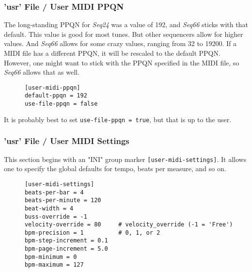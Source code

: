 \subsubsection{'usr' File / User MIDI PPQN}
\label{subsubsec:usr_file_user_midi_ppqn}

   The long-standing PPQN for \textsl{Seq24} was a value of 192, and
   \textsl{Seq66} sticks with that default.
   This value is good for most tunes. But other sequencers allow for higher
   values. And \textsl{Seq66} allows for some crazy values, ranging from
   32 to 19200.  If a MIDI file has a different PPQN, it will be rescaled to
   the default PPQN.  However, one might want to stick with the PPQN
   specified in the MIDI file, so \textsl{Seq66} allows that as well.

   \begin{verbatim}
      [user-midi-ppqn]
      default-ppqn = 192
      use-file-ppqn = false
   \end{verbatim}

   It is probably best to set \texttt{use-file-ppqn = true}, but that is
   up to the user.

\subsubsection{'usr' File / User MIDI Settings}
\label{subsubsec:usr_file_user_midi_settings}

   This section begins with an
   "INI" group marker \texttt{[user-midi-settings]}.
   It allows one to specify the
   global defaults for tempo, beats per measure, and so on.

   \begin{verbatim}
      [user-midi-settings]
      beats-per-bar = 4
      beats-per-minute = 120
      beat-width = 4
      buss-override = -1
      velocity-override = 80     # velocity_override (-1 = 'Free')
      bpm-precision = 1          # 0, 1, or 2
      bpm-step-increment = 0.1
      bpm-page-increment = 5.0
      bpm-minimum = 0
      bpm-maximum = 127
   \end{verbatim}

